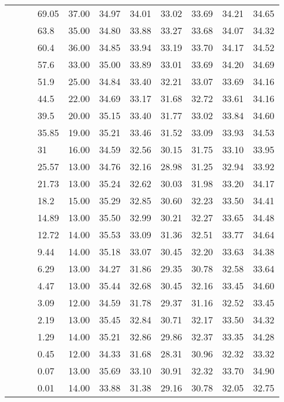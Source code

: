\begin{longtable}{llllrrrrrrr}
   &  &  & 69.05 & 37.00 & 34.97 & 34.01 & 33.02 & 33.69 & 34.21 & 34.65 \\ 
   &  &  & 63.8 & 35.00 & 34.80 & 33.88 & 33.27 & 33.68 & 34.07 & 34.32 \\ 
   &  &  & 60.4 & 36.00 & 34.85 & 33.94 & 33.19 & 33.70 & 34.17 & 34.52 \\ 
   &  &  & 57.6 & 33.00 & 35.00 & 33.89 & 33.01 & 33.69 & 34.20 & 34.69 \\ 
   &  &  & 51.9 & 25.00 & 34.84 & 33.40 & 32.21 & 33.07 & 33.69 & 34.16 \\ 
   &  &  & 44.5 & 22.00 & 34.69 & 33.17 & 31.68 & 32.72 & 33.61 & 34.16 \\ 
   &  &  & 39.5 & 20.00 & 35.15 & 33.40 & 31.77 & 33.02 & 33.84 & 34.60 \\ 
   &  &  & 35.85 & 19.00 & 35.21 & 33.46 & 31.52 & 33.09 & 33.93 & 34.53 \\ 
   &  &  & 31 & 16.00 & 34.59 & 32.56 & 30.15 & 31.75 & 33.10 & 33.95 \\ 
   &  &  & 25.57 & 13.00 & 34.76 & 32.16 & 28.98 & 31.25 & 32.94 & 33.92 \\ 
   &  &  & 21.73 & 13.00 & 35.24 & 32.62 & 30.03 & 31.98 & 33.20 & 34.17 \\ 
   &  &  & 18.2 & 15.00 & 35.29 & 32.85 & 30.60 & 32.23 & 33.50 & 34.41 \\ 
   &  &  & 14.89 & 13.00 & 35.50 & 32.99 & 30.21 & 32.27 & 33.65 & 34.48 \\ 
   &  &  & 12.72 & 14.00 & 35.53 & 33.09 & 31.36 & 32.51 & 33.77 & 34.64 \\ 
   &  &  & 9.44 & 14.00 & 35.18 & 33.07 & 30.45 & 32.20 & 33.63 & 34.38 \\ 
   &  &  & 6.29 & 13.00 & 34.27 & 31.86 & 29.35 & 30.78 & 32.58 & 33.64 \\ 
   &  &  & 4.47 & 13.00 & 35.44 & 32.68 & 30.45 & 32.16 & 33.45 & 34.60 \\ 
   &  &  & 3.09 & 12.00 & 34.59 & 31.78 & 29.37 & 31.16 & 32.52 & 33.45 \\ 
   &  &  & 2.19 & 13.00 & 35.45 & 32.84 & 30.71 & 32.17 & 33.50 & 34.32 \\ 
   &  &  & 1.29 & 14.00 & 35.21 & 32.86 & 29.86 & 32.37 & 33.35 & 34.28 \\ 
   &  &  & 0.45 & 12.00 & 34.33 & 31.68 & 28.31 & 30.96 & 32.32 & 33.32 \\ 
   &  &  & 0.07 & 13.00 & 35.69 & 33.10 & 30.91 & 32.32 & 33.70 & 34.90 \\ 
   &  &  & 0.01 & 14.00 & 33.88 & 31.38 & 29.16 & 30.78 & 32.05 & 32.75 \\ 

\end{longtable}
